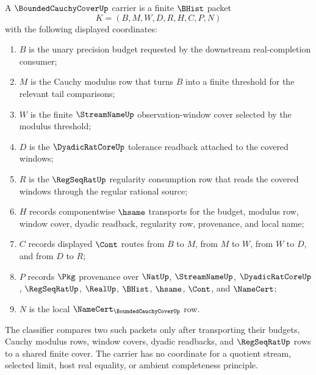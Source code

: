 \begin{definition}
\label{def:bounded-cauchy-cover-carrier}
A $\BoundedCauchyCoverUp$ carrier is a finite $\BHist$ packet
$$
K=(B,M,W,D,R,H,C,P,N)
$$
with the following displayed coordinates:
\begin{enumerate}
\item $B$ is the unary precision budget requested by the downstream real-completion consumer;
\item $M$ is the Cauchy modulus row that turns $B$ into a finite threshold for the relevant tail comparisons;
\item $W$ is the finite $\StreamNameUp$ observation-window cover selected by the modulus threshold;
\item $D$ is the $\DyadicRatCoreUp$ tolerance readback attached to the covered windows;
\item $R$ is the $\RegSeqRatUp$ regularity consumption row that reads the covered windows through the regular rational source;
\item $H$ records componentwise $\hsame$ transports for the budget, modulus row, window cover, dyadic readback, regularity row, provenance, and local name;
\item $C$ records displayed $\Cont$ routes from $B$ to $M$, from $M$ to $W$, from $W$ to $D$, and from $D$ to $R$;
\item $P$ records $\Pkg$ provenance over $\NatUp$, $\StreamNameUp$, $\DyadicRatCoreUp$, $\RegSeqRatUp$, $\RealUp$, $\BHist$, $\hsame$, $\Cont$, and $\NameCert$;
\item $N$ is the local $\NameCert_{\BoundedCauchyCoverUp}$ row.
\end{enumerate}
The classifier compares two such packets only after transporting their budgets, Cauchy modulus rows, window covers, dyadic readbacks, and $\RegSeqRatUp$ rows to a shared finite cover. The carrier has no coordinate for a quotient stream, selected limit, host real equality, or ambient completeness principle.
\end{definition}

